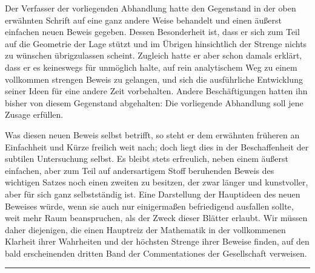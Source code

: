 Der Verfasser der vorliegenden Abhandlung hatte den Gegenstand in der oben erwähnten Schrift auf eine ganz andere Weise behandelt und einen äußerst einfachen neuen Beweis gegeben. Dessen Besonderheit ist, dass er sich zum Teil auf die Geometrie der Lage stützt und im Übrigen hinsichtlich der Strenge nichts zu wünschen übrigzulassen scheint. Zugleich hatte er aber schon damals erklärt, dass er es keineswegs für unmöglich halte, auf rein analytischem Weg zu einem vollkommen strengen Beweis zu gelangen, und sich die ausführliche Entwicklung seiner Ideen für eine andere Zeit vorbehalten. Andere Beschäftigungen hatten ihn bisher von diesem Gegenstand abgehalten: Die vorliegende Abhandlung soll jene Zusage erfüllen.

Was diesen neuen Beweis selbst betrifft, so steht er dem erwähnten früheren an Einfachheit und Kürze freilich weit nach; doch liegt dies in der Beschaffenheit der subtilen Untersuchung selbst. Es bleibt stets erfreulich, neben einem äußerst einfachen, aber zum Teil auf andersartigem Stoff beruhenden Beweis des wichtigen Satzes noch einen zweiten zu besitzen, der zwar länger und kunstvoller, aber für sich ganz selbstständig ist. Eine Darstellung der Hauptideen des neuen Beweises würde, wenn sie auch nur einigermaßen befriedigend ausfallen sollte, weit mehr Raum beanspruchen, als der Zweck dieser Blätter erlaubt. Wir müssen daher diejenigen, die einen Hauptreiz der Mathematik in der vollkommenen Klarheit ihrer Wahrheiten und der höchsten Strenge ihrer Beweise finden, auf den bald erscheinenden dritten Band der Commentationes der Gesellschaft verweisen.
\begin{center}\rule{0.28\linewidth}{0.4pt}\end{center}

